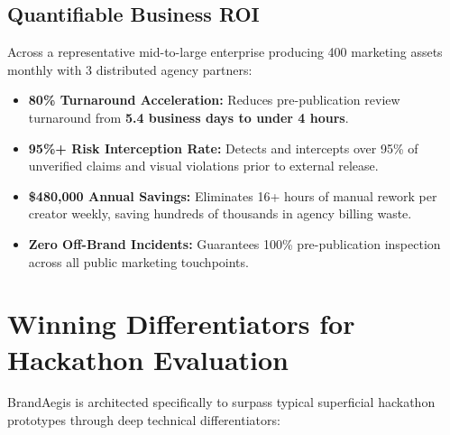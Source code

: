 \documentclass[10pt,a4paper]{article}
\begin{document}
\vspace{0.15cm}

\subsection{Quantifiable Business ROI}
\small Across a representative mid-to-large enterprise producing 400 marketing assets monthly with 3 distributed agency partners:
\begin{itemize}[leftmargin=*,itemsep=2pt]
  \item \textbf{80\% Turnaround Acceleration:} Reduces pre-publication review turnaround from \textbf{5.4 business days to under 4 hours}.
  \item \textbf{95\%+ Risk Interception Rate:} Detects and intercepts over 95\% of unverified claims and visual violations prior to external release.
  \item \textbf{\$480,000 Annual Savings:} Eliminates 16+ hours of manual rework per creator weekly, saving hundreds of thousands in agency billing waste.
  \item \textbf{Zero Off-Brand Incidents:} Guarantees 100\% pre-publication inspection across all public marketing touchpoints.
\end{itemize}

\clearpage


\section{Winning Differentiators for Hackathon Evaluation}

\small BrandAegis is architected specifically to surpass typical superficial hackathon prototypes through deep technical differentiators:

\vspace{0.1cm}
\end{document}
